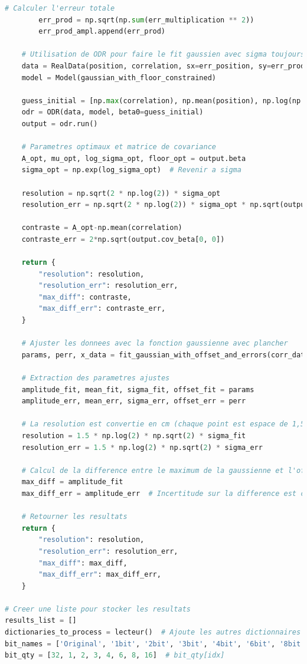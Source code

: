 ﻿\documentclass[11pt,letterpaper]{article}
\begin{document}
\begin{lstlisting}[language=python]
        # Calculer l'erreur totale
        err_prod = np.sqrt(np.sum(err_multiplication ** 2))
        err_prod_ampl.append(err_prod)

    # Utilisation de ODR pour faire le fit gaussien avec sigma toujours positif
    data = RealData(position, correlation, sx=err_position, sy=err_prod_ampl)
    model = Model(gaussian_with_floor_constrained)
    
    guess_initial = [np.max(correlation), np.mean(position), np.log(np.std(position)), np.mean(correlation)]
    odr = ODR(data, model, beta0=guess_initial)
    output = odr.run()

    # Parametres optimaux et matrice de covariance
    A_opt, mu_opt, log_sigma_opt, floor_opt = output.beta
    sigma_opt = np.exp(log_sigma_opt)  # Revenir a sigma

    resolution = np.sqrt(2 * np.log(2)) * sigma_opt
    resolution_err = np.sqrt(2 * np.log(2)) * sigma_opt * np.sqrt(output.cov_beta[2, 2])

    contraste = A_opt-np.mean(correlation)
    contraste_err = 2*np.sqrt(output.cov_beta[0, 0])
    
    return {
        "resolution": resolution,
        "resolution_err": resolution_err,
        "max_diff": contraste,
        "max_diff_err": contraste_err,
    }

    # Ajuster les donnees avec la fonction gaussienne avec plancher
    params, perr, x_data = fit_gaussian_with_offset_and_errors(corr_data, yerr)
    
    # Extraction des parametres ajustes
    amplitude_fit, mean_fit, sigma_fit, offset_fit = params
    amplitude_err, mean_err, sigma_err, offset_err = perr

    # La resolution est convertie en cm (chaque point est espace de 1,5cm)
    resolution = 1.5 * np.log(2) * np.sqrt(2) * sigma_fit
    resolution_err = 1.5 * np.log(2) * np.sqrt(2) * sigma_err  

    # Calcul de la difference entre le maximum de la gaussienne et l'offset
    max_diff = amplitude_fit
    max_diff_err = amplitude_err  # Incertitude sur la difference est celle de l'amplitude

    # Retourner les resultats
    return {
        "resolution": resolution,
        "resolution_err": resolution_err,
        "max_diff": max_diff,
        "max_diff_err": max_diff_err,
    }

# Creer une liste pour stocker les resultats
results_list = []
dictionaries_to_process = lecteur()  # Ajoute les autres dictionnaires ici
bit_names = ['Original', '1bit', '2bit', '3bit', '4bit', '6bit', '8bit', '16bit']
bit_qty = [32, 1, 2, 3, 4, 6, 8, 16]  # bit_qty[idx]


\end{lstlisting}
\end{document}
